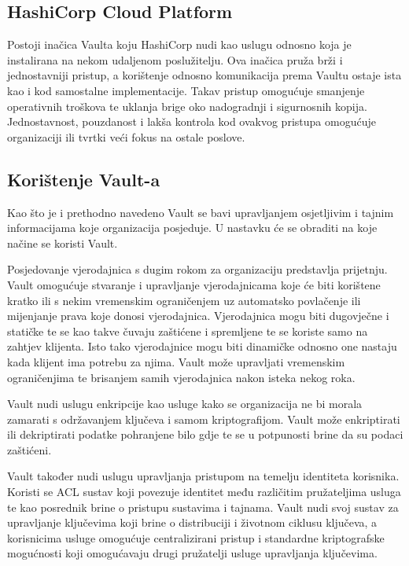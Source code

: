 \documentclass[]{foi}
\begin{document}
\subsection{HashiCorp Cloud Platform}

Postoji inačica Vaulta koju HashiCorp nudi kao uslugu odnosno koja je instalirana na nekom udaljenom poslužitelju.
Ova inačica pruža brži i jednostavniji pristup, a korištenje odnosno komunikacija prema Vaultu ostaje ista kao i kod samostalne implementacije.
Takav pristup omogućuje smanjenje operativnih troškova te uklanja brige oko nadogradnji i sigurnosnih kopija.
Jednostavnost, pouzdanost i lakša kontrola kod ovakvog pristupa omogućuje organizaciji ili tvrtki veći fokus na ostale poslove.


\subsection{Korištenje Vault-a}

Kao što je i prethodno navedeno Vault se bavi upravljanjem osjetljivim i tajnim informacijama koje organizacija posjeduje.
U nastavku će se obraditi na koje načine se koristi Vault.

Posjedovanje vjerodajnica s dugim rokom za organizaciju predstavlja prijetnju.
Vault omogućuje stvaranje i upravljanje vjerodajnicama koje će biti korištene kratko ili s nekim vremenskim ograničenjem uz automatsko povlačenje ili mijenjanje prava koje donosi vjerodajnica.
Vjerodajnica mogu biti dugovječne i statičke te se kao takve čuvaju zaštićene i spremljene te se koriste samo na zahtjev klijenta.
Isto tako vjerodajnice mogu biti dinamičke odnosno one nastaju kada klijent ima potrebu za njima.
Vault može upravljati vremenskim ograničenjima te brisanjem samih vjerodajnica nakon isteka nekog roka.

Vault nudi uslugu enkripcije kao usluge kako se organizacija ne bi morala zamarati s održavanjem ključeva i samom kriptografijom.
Vault može enkriptirati ili dekriptirati podatke pohranjene bilo gdje te se u potpunosti brine da su podaci zaštićeni.

Vault također nudi uslugu upravljanja pristupom na temelju identiteta korisnika.
Koristi se ACL sustav koji povezuje identitet među različitim pružateljima usluga te kao posrednik brine o pristupu sustavima i tajnama. Vault nudi svoj sustav za upravljanje ključevima koji brine o distribuciji i životnom ciklusu ključeva, a korisnicima usluge omogućuje centralizirani pristup i standardne kriptografske mogućnosti koji omogućavaju drugi pružatelji usluge upravljanja ključevima. \cite{hashicorp-vault-use-cases}
\end{document}
